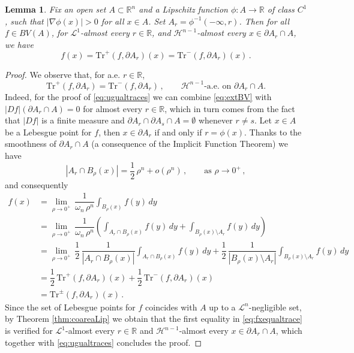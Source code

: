 \documentclass[a4paper,reqno,11pt]{amsart}
\newtheorem{lemma}[theorem]{Lemma}
\newcommand{\R}{\mathbb{R}}
\newcommand{\ra}{\rightarrow}
\newcommand{\Hau}{{\mathcal H}} %
\newcommand{\de}{\partial}
\newcommand{\cL}{\mathcal{L}}
\newcommand{\Tr}{{\mathrm{Tr}}}
\begin{document}
\begin{lemma} \label{lem:faetrace}
Fix an open set $A \subset \R^{n}$ and a Lipschitz function $\phi:A\to \R$ of class $C^{1}$, such that $|\nabla \phi(x)|>0$ for all $x\in A$. Set $A_{r} = \phi^{-1}(-\infty,r)$. Then for all $f \in BV(A)$, for $\cL^{1}$-almost every $r\in \R$, and $\Hau^{n-1}$-almost every $x \in \de A_{r}\cap A$, we have
\begin{equation}\label{eq:fxequaltrace}
f(x) = \Tr^{+} (f, \de A_{r})(x) = \Tr^{-} (f, \de A_{r})(x) \, .
\end{equation}
\end{lemma}
\begin{proof}
We observe that, for a.e. $r\in \R$,
\begin{equation}\label{eq:ugualtraces}
\Tr^{+} (f, \de A_{r}) = \Tr^{-} (f, \de A_{r}) \, , \qquad \text{$\Hau^{n-1}$-a.e. on $\de A_{r}\cap A$.}
\end{equation}
Indeed, for the proof of \eqref{eq:ugualtraces} we can combine \eqref{eq:extBV} with $|Df|(\de A_{r}\cap A) = 0$ for almost every $r\in \R$, which in turn comes from the fact that $|Df|$ is a finite measure and $\de A_{r}\cap \de A_{s} \cap A = \emptyset$ whenever $r\neq s$. Let $x \in A$ be a Lebesgue point for $f$, then $x \in \de A_{r}$ if and only if $r = \phi(x)$. Thanks to the smoothness of $\de A_{r}\cap A$ (a consequence of the Implicit Function Theorem) we have
\begin{equation*}
	|A_{r} \cap B_{\rho}(x)| = \dfrac{1}{2} \, \rho^{n} + o(\rho^{n}) \, , \qquad \text{as } \rho \ra 0^+ \, ,
\end{equation*}
and consequently
\begin{align*}
	f(x) & = \lim_{\rho \ra 0^+} \, \dfrac{1}{\omega_{n} \, \rho^{n}} \int_{B_{\rho}(x)} f(y) \, dy \\
			& = \lim_{\rho \ra 0^+} \, \dfrac{1}{\omega_{n} \, \rho^{n}} \left( \int_{A_{r} \cap B_{\rho}(x)} f(y) \, dy + \int_{B_{\rho}(x) \setminus A_{r}} f(y) \, dy \right) \\
			& = \lim_{\rho \ra 0^+} \, \dfrac{1}{2} \, \dfrac{1}{|A_{r} \cap B_{\rho}(x)|} \int_{A_{r} \cap B_{\rho}(x)} f(y) \, dy + \dfrac{1}{2} \, \dfrac{1}{|B_{\rho}(x) \setminus A_{r}|} \int_{B_{\rho}(x) \setminus A_{r}} f(y) \, dy \\
			& = \dfrac{1}{2} \, \Tr^{+}(f, \de A_{r})(x) + \dfrac{1}{2} \, \Tr^{-}(f, \de A_{r})(x)\\
			& = \Tr^{\pm}(f, \de A_{r})(x) \, .
\end{align*}
Since the set of Lebesgue points for $f$ coincides with $A$ up to a $\cL^{n}$-negligible set, by Theorem \ref{thm:coareaLip} we obtain that the first equality in \eqref{eq:fxequaltrace} is verified for $\cL^{1}$-almost every $r\in \R$ and $\Hau^{n-1}$-almost every $x \in \de A_{r}\cap A$, which together with \eqref{eq:ugualtraces} concludes the proof.
\end{proof}
\end{document}
